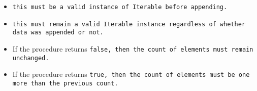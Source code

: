 

\begin{itemize}

\item \tt{this} must be a valid instance of \tt{Iterable} before appending.

\end{itemize}


\begin{itemize}

\item \tt{this} must remain a valid \tt{Iterable} instance
regardless of whether \tt{data} was appended or not.

\item If the procedure returns \tt{false},
then the count of elements must remain unchanged.

\item If the procedure returns \tt{true}\s,
then the count of elements must be one more than the previous count.

\end{itemize}
